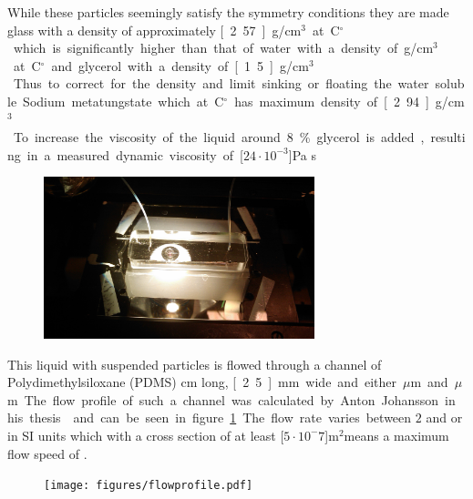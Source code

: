While these particles seemingly satisfy the symmetry conditions they are made glass with a density of approximately \unit[2.57]{g/cm$^3$} at \unit[20]{C$^\circ$} which is significantly higher than that of water with a density of \unit[1]{g/cm$^3$} at \unit[20]{C$^\circ$} and glycerol with a density of \unit[1.5]{g/cm$^3$}. Thus to correct for the density and limit sinking or floating the water soluble Sodium metatungstate which at \unit[20]{C$^\circ$} has maximum density of \unit[2.94]{g/cm$^3$}. To increase the viscosity of the liquid around 8\% glycerol is added, resulting in a measured dynamic viscosity of \unit[$24\cdot 10^{-3}$]{Pa s}

\begin{figure}[H]
\centering
\includegraphics[width=0.7\textwidth]{figures/ChannelZoomed.jpg}
\end{figure}


This liquid with suspended particles is flowed through a channel of Polydimethylsiloxane (PDMS) \unit[4]{cm} long,
 \unit[2.5]{mm} wide and either \unit[200]{$\mu$m} and \unit[500]{$\mu$m}. The flow profile of such a channel was 
 calculated by Anton Johansson in his thesis\cite{AntonThesis} and can be seen in figure \ref{fig:flowprofile}. The 
 flow rate varies  between $2$ and  or in SI units  
 which with a cross section of at least \unit[$5\cdot 10^-7$]{m$^2$}means a maximum flow speed of  
 .

\begin{figure}[H]
\begin{center}
\texttt{[image: figures/flowprofile.pdf]}
\end{center}
\caption{}
\label{fig:flowprofile}
\end{figure}

